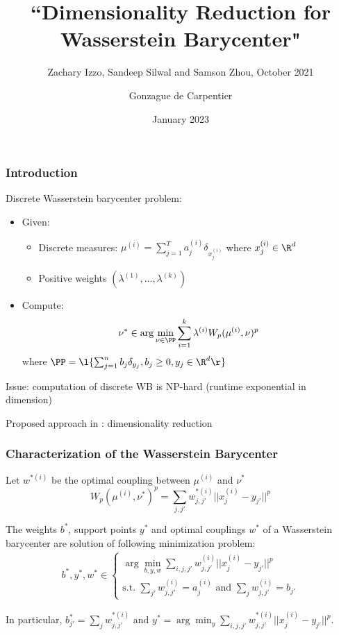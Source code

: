 \documentclass{beamer}
\title[Dimensionality Reduction for WB]{``Dimensionality Reduction for Wasserstein Barycenter"}
\subtitle{
    Zachary Izzo, Sandeep Silwal and Samson Zhou, October 2021
}
\author{Gonzague de Carpentier}
\date{January 2023}
\begin{document}
\frame{\titlepage}

\begin{frame}
\frametitle{Introduction}

Discrete Wasserstein barycenter problem:

\begin{itemize}
    \item Given:
    \begin{itemize}
        \item Discrete measures: $\mu^{(i)} = \sum_{j=1}^T a^{(i)}_j \delta_{x^{(i)}_j}$ where $x^{(i)}_j \in \R^d$
        \item Positive weights $(\lambda^{(1)}, ..., \lambda^{(k)})$
    \end{itemize}
    \item Compute: 
    $$\nu^* \in \arg \min_{\nu \in \PP} \sum_{i=1}^k \lambda^{(i)} W_p(\mu^{(i)}, \nu)^p$$
    where $\PP = \l\{ \sum_{j=1}^n b_j \delta_{y_j} , b_j \geq 0, y_j \in \R^d \r\}$
\end{itemize}

Issue: computation of discrete WB is NP-hard (runtime exponential in dimension) \cite{altschuler_wasserstein_2020}

Proposed approach in \cite{izzo_dimensionality_2021} : dimensionality reduction

\end{frame}

\begin{frame}
\frametitle{Characterization of the Wasserstein Barycenter}

Let $w^{*(i)}$ be the optimal coupling between $\mu^{(i)}$ and $\nu^*$
$$W_p(\mu^{(i)}, \nu^*)^p = \sum_{j, j'} w^{*(i)}_{j,j'} ||x^{(i)}_j - y_{j'}||^p$$

The weights $b^*$, support points $y^*$ and optimal couplings $w^*$ of a Wasserstein barycenter are solution of following minimization problem:
\begin{align}
    \label{eqn:discretewb}
    b^*, y^*, w^* \in 
    \begin{cases}
        \arg\min_{b, y, w} \sum_{i, j, j'} w^{(i)}_{j,j'} ||x^{(i)}_j - y_{j'}||^p \\
        \text{s.t. } \sum_{j'} w^{(i)}_{j,j'} = a^{(i)}_j \text{ and } \sum_j w^{(i)}_{j,j'} = b_{j'}
    \end{cases}
\end{align}

In particular, $b^*_{j'} = \sum_j w^{*(i)}_{j,j'}$ and $y^* = \arg\min_y \sum_{i, j, j'} w^{*(i)}_{j,j'} ||x^{(i)}_j - y_{j'}||^p$.
\end{frame}
\end{document}
